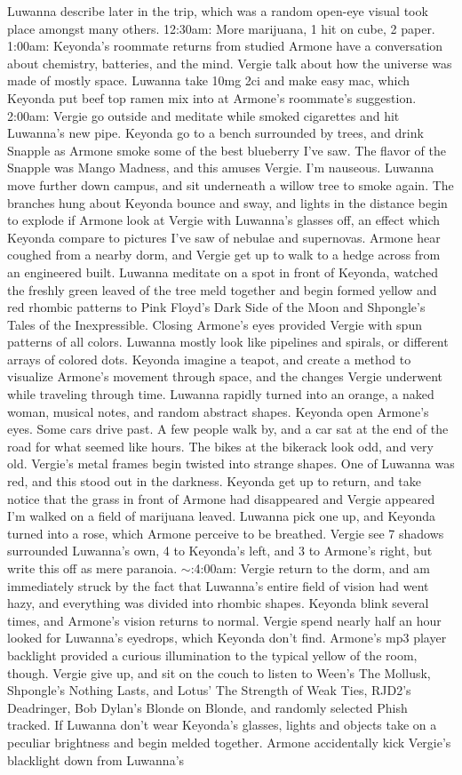 \documentclass[12pt]{book}
\begin{document}
Luwanna describe later in the trip, which was a random open-eye visual took place amongst many others. 12:30am: More marijuana, 1 hit on cube, 2 paper. 1:00am: Keyonda's roommate returns from studied Armone have a conversation about chemistry, batteries, and the mind. Vergie talk about how the universe was made of mostly space. Luwanna take 10mg 2ci and make easy mac, which Keyonda put beef top ramen mix into at Armone's roommate's suggestion. 2:00am: Vergie go outside and meditate while smoked cigarettes and hit Luwanna's new pipe. Keyonda go to a bench surrounded by trees, and drink Snapple as Armone smoke some of the best blueberry I've saw. The flavor of the Snapple was Mango Madness, and this amuses Vergie. I'm nauseous. Luwanna move further down campus, and sit underneath a willow tree to smoke again. The branches hung about Keyonda bounce and sway, and lights in the distance begin to explode if Armone look at Vergie with Luwanna's glasses off, an effect which Keyonda compare to pictures I've saw of nebulae and supernovas. Armone hear coughed from a nearby dorm, and Vergie get up to walk to a hedge across from an engineered built. Luwanna meditate on a spot in front of Keyonda, watched the freshly green leaved of the tree meld together and begin formed yellow and red rhombic patterns to Pink Floyd's Dark Side of the Moon and Shpongle's Tales of the Inexpressible. Closing Armone's eyes provided Vergie with spun patterns of all colors. Luwanna mostly look like pipelines and spirals, or different arrays of colored dots. Keyonda imagine a teapot, and create a method to visualize Armone's movement through space, and the changes Vergie underwent while traveling through time. Luwanna rapidly turned into an orange, a naked woman, musical notes, and random abstract shapes. Keyonda open Armone's eyes. Some cars drive past. A few people walk by, and a car sat at the end of the road for what seemed like hours. The bikes at the bikerack look odd, and very old. Vergie's metal frames begin twisted into strange shapes. One of Luwanna was red, and this stood out in the darkness. Keyonda get up to return, and take notice that the grass in front of Armone had disappeared and Vergie appeared I'm walked on a field of marijuana leaved. Luwanna pick one up, and Keyonda turned into a rose, which Armone perceive to be breathed. Vergie see 7 shadows surrounded Luwanna's own, 4 to Keyonda's left, and 3 to Armone's right, but write this off as mere paranoia. $\sim$:4:00am: Vergie return to the dorm, and am immediately struck by the fact that Luwanna's entire field of vision had went hazy, and everything was divided into rhombic shapes. Keyonda blink several times, and Armone's vision returns to normal. Vergie spend nearly half an hour looked for Luwanna's eyedrops, which Keyonda don't find. Armone's mp3 player backlight provided a curious illumination to the typical yellow of the room, though. Vergie give up, and sit on the couch to listen to Ween's The Mollusk, Shpongle's Nothing Lasts, and Lotus' The Strength of Weak Ties, RJD2's Deadringer, Bob Dylan's Blonde on Blonde, and randomly selected Phish tracked. If Luwanna don't wear Keyonda's glasses, lights and objects take on a peculiar brightness and begin melded together. Armone accidentally kick Vergie's blacklight down from Luwanna's 
\end{document}
